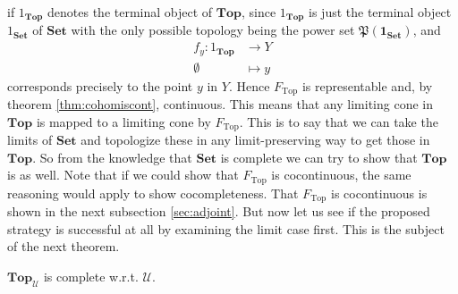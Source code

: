 if $1_{\mathbf{Top}}$ denotes the terminal object of $\mathbf{Top}$, since $1_{\mathbf{Top}}$ is just the terminal object $1_{\mathbf{Set}}$ of $\mathbf{Set}$ with the only possible topology being the power set $\mathfrak{P}(\mathbf{1}_{\mathbf{Set}})$, and
\begin{align*}
  f_{y}
  \colon
  1_{\mathbf{Top}}
  &\rightarrow
  Y
  \\
  \emptyset
  &\mapsto
  y
\end{align*}
corresponds precisely to the point $y$ in $Y$.
Hence $F_{\mathrm{Top}}$ is representable and, by theorem \ref{thm:cohomiscont}, continuous.
This means that any limiting cone in $\mathbf{Top}$ is mapped to a limiting cone by $F_{\mathrm{Top}}$.
This is to say that we can take the limits of $\mathbf{Set}$ and topologize these in any limit-preserving way to get those in $\mathbf{Top}$.
So from the knowledge that $\mathbf{Set}$ is complete we can try to show that $\mathbf{Top}$ is as well.
Note that if we could show that $F_{\mathrm{Top}}$ is cocontinuous, the same reasoning would apply to show cocompleteness.
That $F_{\mathrm{Top}}$ is cocontinuous is shown in the next subsection \ref{sec:adjoint}.
But now let us see if the proposed strategy is successful at all by examining the limit case first.
This is the subject of the next theorem.
\\
\begin{thm}
\label{thm:topcomplete}
$\mathbf{Top}_{\mathcal{U}}$ is complete w.r.t. $\mathcal{U}$.
\end{thm}
